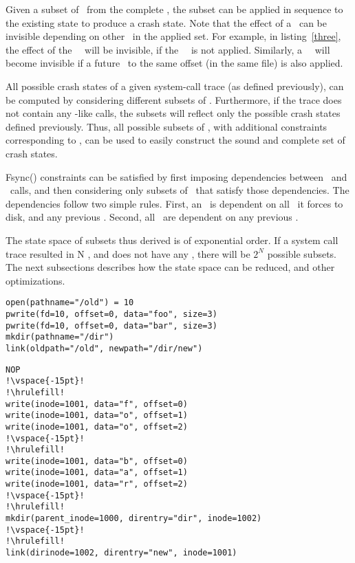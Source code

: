 Given a subset of \microinstructions\ from the complete \microprogram, the subset can be applied in sequence to the existing state to produce a crash state. Note that the effect of a \microinstruction\ can be invisible depending on other \microinstructions\ in the applied set. For example, in listing~\ref{three}, the effect of the \linkSC\ \microinstruction\ will be invisible, if the \mkdirSC\ \microinstruction\ is not applied. Similarly, a \writeSC\ \microinstruction\ will become invisible if a future \writeSC\ to the same offset (in the same file) is also applied.

All possible crash states of a given system-call trace (as defined previously), can be computed by considering different subsets of \microinstructions. Furthermore, if the trace does not contain any \fsyncSC-like calls, the subsets will reflect only the possible crash states defined previously. Thus, all possible subsets of \microinstructions, with additional constraints corresponding to \fsyncSC, can be used to easily construct the sound and complete set of crash states.

Fsync() constraints can be satisfied by first imposing dependencies between \microinstructions\ and \fsyncSC\ calls, and then considering only subsets of \microinstruction\ that satisfy those dependencies. The dependencies follow two simple rules. First, an \fsyncSC\ is dependent on all \microinstructions\ it forces to disk, and any previous \fsyncSC. Second, all \microinstructions\ are dependent on any previous \fsyncSC.

The state space of subsets thus derived is of exponential order. If a system call trace resulted in N \microinstructions, and does not have any \fsyncSC, there will be $2^N$ possible subsets. The next subsections describes how the state space can be reduced, and other optimizations.
\begin{lstlisting}[float=t, caption = {\textbf{System-call trace.}}, label = {two}, escapechar=!]
open(pathname="/old") = 10
pwrite(fd=10, offset=0, data="foo", size=3)
pwrite(fd=10, offset=0, data="bar", size=3)
mkdir(pathname="/dir")
link(oldpath="/old", newpath="/dir/new")
\end{lstlisting}

\begin{lstlisting}[float=t, caption = {\textbf{Microprogram. }{\footnotesize {\it Inodes 1000 and 1002 correspond to directories ``/'' and ``/dir'' respectively. Inode 1001 corresponds to the file ``/old''.}}}, label = {three}, escapechar=!]
NOP
!\vspace{-15pt}!
!\hrulefill!
write(inode=1001, data="f", offset=0)
write(inode=1001, data="o", offset=1)
write(inode=1001, data="o", offset=2)
!\vspace{-15pt}!
!\hrulefill!
write(inode=1001, data="b", offset=0)
write(inode=1001, data="a", offset=1)
write(inode=1001, data="r", offset=2)
!\vspace{-15pt}!
!\hrulefill!
mkdir(parent_inode=1000, direntry="dir", inode=1002)
!\vspace{-15pt}!
!\hrulefill!
link(dirinode=1002, direntry="new", inode=1001)
\end{lstlisting}

